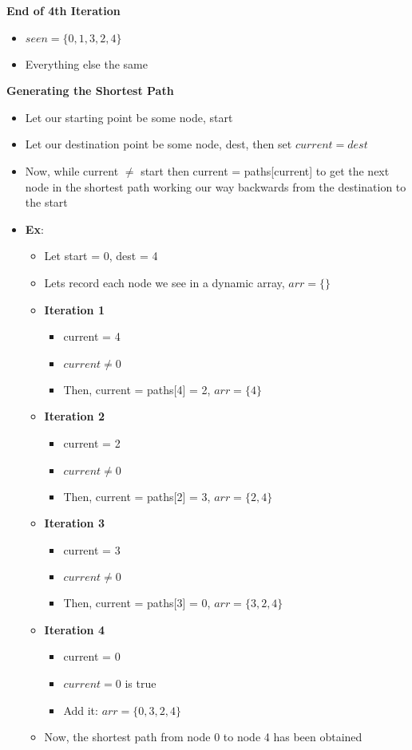 \documentclass[10pt, 
a4paper, 
oneside, 
headinclude, footinclude, 
BCOR5mm]
{scrartcl}
\begin{document}
\textbf{End of 4th Iteration}
\begin{itemize}
    \item $seen = \{0, 1, 3, 2, 4\}$
    \item Everything else the same
\end{itemize}
\textbf{Generating the Shortest Path}
\begin{itemize}
    \item Let our starting point be some node, start
    \item Let our destination point be some node, dest, then set $current = dest$
    \item Now, while current $\neq$ start then current = paths[current] to get the next node in the shortest path working
    our way backwards from the destination to the start
    \item \textbf{Ex}:
    \begin{itemize}
        \item Let start = 0, dest = 4
        \item Lets record each node we see in a dynamic array, $arr = \{\}$
        \item \textbf{Iteration 1}
        \begin{itemize}
            \item current = 4
            \item $current \neq 0$
            \item Then, current = paths[4] = 2, $arr = \{4\}$
        \end{itemize}
        \item \textbf{Iteration 2}
         \begin{itemize}
            \item current = 2
            \item $current \neq 0$
            \item Then, current = paths[2] = 3, $arr = \{2, 4\}$
        \end{itemize}
        \item \textbf{Iteration 3}
        \begin{itemize}
            \item current = 3
            \item $current \neq 0$
            \item Then, current = paths[3] = 0, $arr = \{3, 2, 4\}$
        \end{itemize}
        \item \textbf{Iteration 4}
        \begin{itemize}
            \item current = 0
            \item $current = 0$ is true
            \item Add it: $arr = \{0, 3, 2, 4\}$
        \end{itemize}
        \item Now, the shortest path from node 0 to node 4 has been obtained
    \end{itemize}
\end{itemize}
\end{document}
